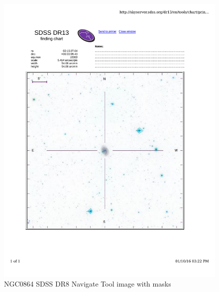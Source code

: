 \documentclass[10pt,letterpaper]{article}
\begin{document}
\begin{figure}[h!]
\centering
\includegraphics[scale=0.7]{figures/NGC0864.pdf}
\caption{NGC0864 SDSS DR8 Navigate Tool image with masks}
\end{figure}
\end{document}
